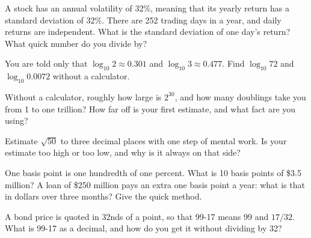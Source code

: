 \begin{question}\label{iq:iv1:mental-technique:13}
A stock has an annual volatility of 32\%, meaning that its yearly return has a standard deviation of 32\%. There are 252 trading days in a year, and daily returns are independent. What is the standard deviation of one day's return? What quick number do you divide by?
\end{question}

\begin{question}\label{iq:iv1:mental-technique:14}
You are told only that $\log_{10} 2 \approx 0.301$ and $\log_{10} 3 \approx 0.477$. Find $\log_{10} 72$ and $\log_{10} 0.0072$ without a calculator.
\end{question}

\begin{question}\label{iq:iv1:mental-technique:15}
Without a calculator, roughly how large is $2^{30}$, and how many doublings take you from 1 to one trillion? How far off is your first estimate, and what fact are you using?
\end{question}

\begin{question}\label{iq:iv1:mental-technique:16}
Estimate $\sqrt{50}$ to three decimal places with one step of mental work. Is your estimate too high or too low, and why is it always on that side?
\end{question}

\begin{question}\label{iq:iv1:mental-technique:17}
One basis point is one hundredth of one percent. What is 10 basis points of \$3.5 million? A loan of \$250 million pays an extra one basis point a year: what is that in dollars over three months? Give the quick method.
\end{question}

\begin{question}\label{iq:iv1:mental-technique:18}
A bond price is quoted in 32nds of a point, so that 99-17 means 99 and $17/32$. What is 99-17 as a decimal, and how do you get it without dividing by 32?
\end{question}

